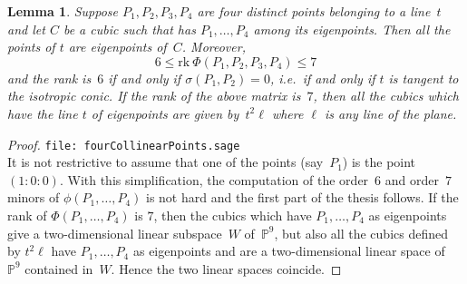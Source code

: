 \documentclass{amsart}
\theoremstyle{plain}
\newtheorem{lemma}{Lemma}[section]
\theoremstyle{definition}
\newcommand{\p}{\mathbb{P}}
\newcommand{\rk}{\ensuremath{\mathrm{rk}}}
\begin{document}
\begin{lemma}
\label{4ptiSuRetta2}
Suppose $P_1, P_2, P_3, P_4$ are four distinct points belonging to a line~$t$
and let $C$ be a cubic such that has $P_1, \dots, P_4$ among its eigenpoints. 
Then all the points of $t$ are eigenpoints of~$C$.
Moreover,
%
\begin{equation*}
6 \leq \rk \ \Phi(P_1, P_2, P_3, P_4) \leq 7
\end{equation*}
%
and the rank is~$6$ if and only if $\sigma(P_1, P_2) = 0$, i.e.\ if
and only if $t$ is tangent to the isotropic conic. If the rank of
the above matrix is~$7$, then all the cubics which have the line $t$
of eigenpoints are given by~$t^2 \ell$ where $\ell$ is any line of the plane.
\end{lemma}
\begin{proof}
\verb+file: fourCollinearPoints.sage+\\
It is not restrictive to assume that one of the points (say~$P_1$) is
the point~$(1: 0: 0)$.
With this simplification, the computation of the order~$6$ and order~$7$
minors of $\phi(P_1, \dots, P_4)$ is not hard and
the first part of the thesis follows. If the rank of $\Phi(P_1, \dots, P_4)$
is $7$, then the cubics which have $P_1, \dots, P_4$ as eigenpoints
give a two-dimensional linear subspace~$W$ of~$\p^9$, but also all
the cubics defined by $t^2 \ell$ have $P_1, \dots, P_4$ as eigenpoints and are
a two-dimensional linear space of~$\p^9$ contained in~$W$. Hence the two linear
spaces coincide.
\end{proof}
\end{document}
